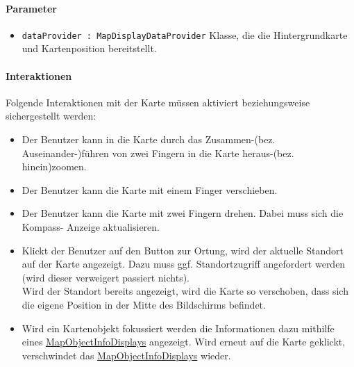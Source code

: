 \paragraph*{Parameter}
\begin{itemize}
    \item \texttt{dataProvider : MapDisplayDataProvider} Klasse, die die Hintergrundkarte und Kartenposition bereitstellt.
\end{itemize}

\paragraph*{Interaktionen}
Folgende Interaktionen mit der Karte müssen aktiviert beziehungsweise sichergestellt werden:
\begin{itemize}
    \item Der Benutzer kann in die Karte durch das Zusammen-(bez. Auseinander-)führen von zwei 
    Fingern in die Karte heraus-(bez. hinein)zoomen.
    \item Der Benutzer kann die Karte mit einem Finger verschieben.
    \item Der Benutzer kann die Karte mit zwei Fingern drehen. Dabei muss sich die Kompass-
    Anzeige aktualisieren.
    \item Klickt der Benutzer auf den Button zur Ortung, wird der aktuelle Standort auf der Karte 
    angezeigt. Dazu muss ggf. Standortzugriff angefordert werden (wird dieser verweigert passiert 
    nichts).\\
    Wird der Standort bereits angezeigt, wird die Karte so verschoben, dass sich die eigene Position 
    in der Mitte des Bildschirms befindet. \\
    \item Wird ein Kartenobjekt fokussiert werden die Informationen dazu mithilfe eines \hyperref[App_Map_View_MapObjectInfoDisplay]{MapObjectInfoDisplays} angezeigt. 
    Wird erneut auf die Karte geklickt, verschwindet das \hyperref[App_Map_View_MapObjectInfoDisplay]{MapObjectInfoDisplays} wieder.

\end{itemize}

